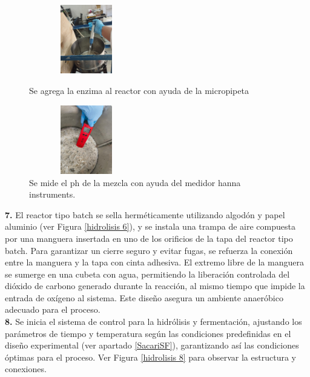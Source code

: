 \documentclass[12pt]{article}
\begin{document}
	     \begin{figure}[H]
	     	\centering
	     	\begin{minipage}{0.46\textwidth}
	     		\centering
	     		\includegraphics[width=5cm, height=3cm]{imagenes/hidrolisis9} %
	     		\caption{ Se agrega la enzima al reactor con ayuda de la micropipeta }
	     		\label{hidrolisis9}
	     	\end{minipage}
	     	\hfill
	     	\begin{minipage}{0.48\textwidth}
	     		\centering
	     		\includegraphics[width=5cm, height=3cm]{imagenes/hidrolisis3 } %
	     		\caption{ Se mide el ph de la mezcla con ayuda del medidor hanna instruments.}
	     		\label{hidrolisis3}
	     	\end{minipage}
	     \end{figure}
	     
	      \textbf{7.} El reactor tipo batch se sella herméticamente utilizando algodón y papel aluminio (ver Figura \ref{hidrolisis 6}), y se instala una trampa de aire compuesta por una manguera insertada en uno de los orificios de la tapa del reactor tipo batch. Para garantizar un cierre seguro y evitar fugas, se refuerza la conexión entre la manguera y la tapa con cinta adhesiva. El extremo libre de la manguera se sumerge en una cubeta con agua, permitiendo la liberación controlada del dióxido de carbono generado durante la reacción, al mismo tiempo que impide la entrada de oxígeno al sistema. Este diseño asegura un ambiente anaeróbico adecuado para el proceso.
	      \\[0.5em]
	     
	     	\textbf{8.} Se inicia el sistema de control para la hidrólisis y fermentación, ajustando los parámetros de tiempo y temperatura según las condiciones predefinidas en el diseño experimental (ver apartado \ref{SacariSF}), garantizando así las condiciones óptimas para el proceso. Ver Figura \ref{hidrolisis 8} para observar la estructura y conexiones.
	     	
\end{document}
